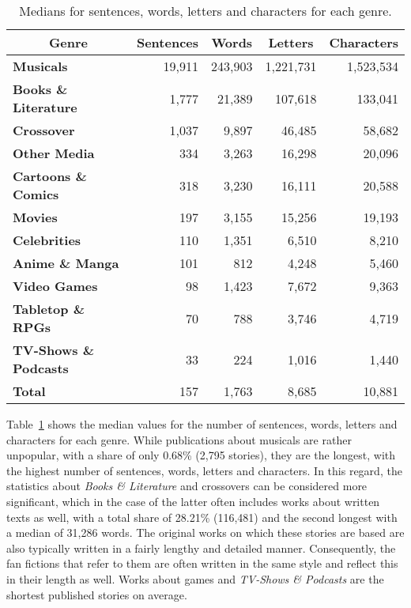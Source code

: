 \begin{table}[htb]
    \renewcommand{\arraystretch}{1.25}
    \centering
    \begin{tabular}{lrrrr}
        \toprule
        \multicolumn{1}{c}{\textbf{Genre}} &
        \multicolumn{1}{c}{\textbf{Sentences}} &
        \multicolumn{1}{c}{\textbf{Words}} &
        \multicolumn{1}{c}{\textbf{Letters}} &
        \multicolumn{1}{c}{\textbf{Characters}} \\
        \midrule
        \textbf{Musicals}             & 19,911 & 243,903 & 1,221,731 & 1,523,534 \\
        \textbf{Books \& Literature}  & 1,777  & 21,389  & 107,618   & 133,041   \\
        \textbf{Crossover}            & 1,037  & 9,897   & 46,485    & 58,682    \\
        \textbf{Other Media}          & 334    & 3,263   & 16,298    & 20,096    \\
        \textbf{Cartoons \& Comics}   & 318    & 3,230   & 16,111    & 20,588    \\
        \textbf{Movies}               & 197    & 3,155   & 15,256    & 19,193    \\
        \textbf{Celebrities}          & 110    & 1,351   & 6,510     & 8,210     \\
        \textbf{Anime \& Manga}       & 101    & 812     & 4,248     & 5,460     \\
        \textbf{Video Games}          & 98     & 1,423   & 7,672     & 9,363     \\
        \textbf{Tabletop \& RPGs}     & 70     & 788     & 3,746     & 4,719     \\
        \textbf{TV-Shows \& Podcasts} & 33     & 224     & 1,016     & 1,440     \\
        \midrule
        \textbf{Total}                & 157    & 1,763   & 8,685     & 10,881    \\
        \bottomrule
    \end{tabular}
    \caption[Medians for sentences, words, letters and characters for each genre.]{Medians for sentences, words, letters and characters for each genre.}
    \label{tab:median-counts}
\end{table}

Table~\ref{tab:median-counts} shows the median values for the number of sentences, words, letters and characters for each genre.
While publications about musicals are rather unpopular, with a share of only 0.68\% (2,795 stories), they are the longest, with the highest number of sentences, words, letters and characters.
In this regard, the statistics about \emph{Books \& Literature} and crossovers can be considered more significant, which in the case of the latter often includes works about written texts as well, with a total share of 28.21\% (116,481) and the second longest with a median of 31,286 words.
The original works on which these stories are based are also typically written in a fairly lengthy and detailed manner.
Consequently, the fan fictions that refer to them are often written in the same style and reflect this in their length as well.
Works about games and \emph{TV-Shows \& Podcasts} are the shortest published stories on average.

